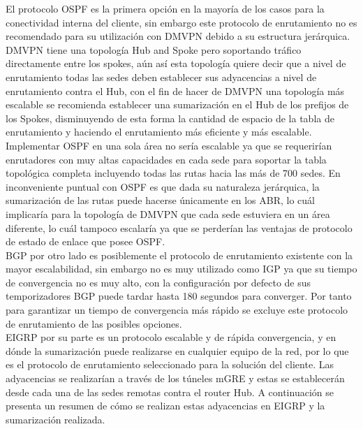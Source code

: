 El protocolo OSPF es la primera opción en la mayoría de los casos para la conectividad interna del cliente, sin embargo este protocolo de enrutamiento no es recomendado para su utilización con DMVPN debido a su estructura jerárquica. DMVPN tiene una topología Hub and Spoke pero soportando tráfico directamente entre los spokes, aún así esta topología quiere decir que a nivel de enrutamiento todas las sedes deben establecer sus adyacencias a nivel de enrutamiento contra el Hub, con el fin de hacer de DMVPN una topología más escalable se recomienda establecer una sumarización en el Hub de los prefijos de los Spokes, disminuyendo de esta forma la cantidad de espacio de la tabla de enrutamiento y haciendo el enrutamiento más eficiente y más escalable.\\
Implementar OSPF en una sola área no sería escalable ya que se requerirían enrutadores con muy altas capacidades en cada sede para soportar la tabla topológica completa incluyendo todas las rutas hacia las más de 700 sedes. En inconveniente puntual con OSPF es que dada su naturaleza jerárquica, la sumarización de las rutas puede hacerse únicamente en los ABR, lo cuál implicaría para la topología de DMVPN que cada sede estuviera en un área diferente, lo cuál tampoco escalaría ya que se perderían las ventajas de protocolo de estado de enlace que posee OSPF.
\\
BGP por otro lado es posiblemente el protocolo de enrutamiento existente con la mayor escalabilidad, sin embargo no es muy utilizado como IGP ya que su tiempo de convergencia no es muy alto, con la configuración por defecto de sus temporizadores BGP puede tardar hasta 180 segundos para converger. Por tanto para garantizar un tiempo de convergencia más rápido se excluye este protocolo de enrutamiento de las posibles opciones.
\\
EIGRP por su parte es un protocolo escalable y de rápida convergencia, y en dónde la sumarización puede realizarse en cualquier equipo de la red, por lo que es el protocolo de enrutamiento seleccionado para la solución del cliente. Las adyacencias se realizarían a través de los túneles mGRE y estas se establecerán desde cada una de las sedes remotas contra el router Hub. A continuación se presenta un resumen de cómo se realizan estas adyacencias en EIGRP y la sumarización realizada.